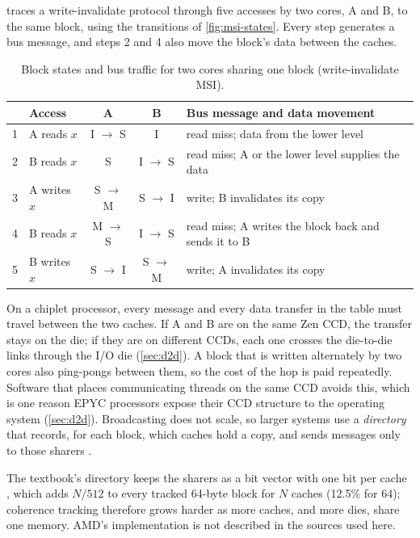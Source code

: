  traces a write-invalidate protocol through five accesses by two cores, A and B, to the same block, using the transitions of \cref{fig:msi-states}. Every step generates a bus message, and steps 2 and 4 also move the block's data between the caches.

\begin{table}[htbp]
  \centering
  \caption[Block states and bus traffic for two cores sharing one block]{Block states and bus traffic for two cores sharing one block (write-invalidate MSI).}
  \label{tab:msi-example}
  \small
  \begin{tabularx}{\textwidth}{@{}l>{\raggedright\arraybackslash}p{2.5cm}cc>{\raggedright\arraybackslash}X@{}}
    \toprule
    & \textbf{Access} & \textbf{A} & \textbf{B} & \textbf{Bus message and data movement} \\
    \midrule
    1 & A reads $x$ & I $\to$ S & I & read miss; data from the lower level \\
    2 & B reads $x$ & S & I $\to$ S & read miss; A or the lower level supplies the data \\
    3 & A writes $x$ & S $\to$ M & S $\to$ I & write; B invalidates its copy \\
    4 & B reads $x$ & M $\to$ S & I $\to$ S & read miss; A writes the block back and sends it to B \\
    5 & B writes $x$ & S $\to$ I & S $\to$ M & write; A invalidates its copy \\
    \bottomrule
  \end{tabularx}
\end{table}

On a chiplet processor, every message and every data transfer in the table must travel between the two caches. If A and B are on the same Zen CCD, the transfer stays on the die; if they are on different CCDs, each one crosses the die-to-die links through the I/O die (\cref{sec:d2d}). A block that is written alternately by two cores also ping-pongs between them, so the cost of the hop is paid repeatedly. Software that places communicating threads on the same CCD avoids this, which is one reason EPYC processors expose their CCD structure to the operating system (\cref{sec:d2d}). Broadcasting does not scale, so larger systems use a \emph{directory} that records, for each block, which caches hold a copy, and sends messages only to those sharers \cite[sec.~12.4.6]{sarangi2025basic}.

The textbook's directory keeps the sharers as a bit vector with one bit per cache \cite[sec.~12.4.6]{sarangi2025basic}, which adds $N/512$ to every tracked 64-byte block for $N$ caches (12.5\% for 64); coherence tracking therefore grows harder as more caches, and more dies, share one memory. AMD's implementation is not described in the sources used here.

